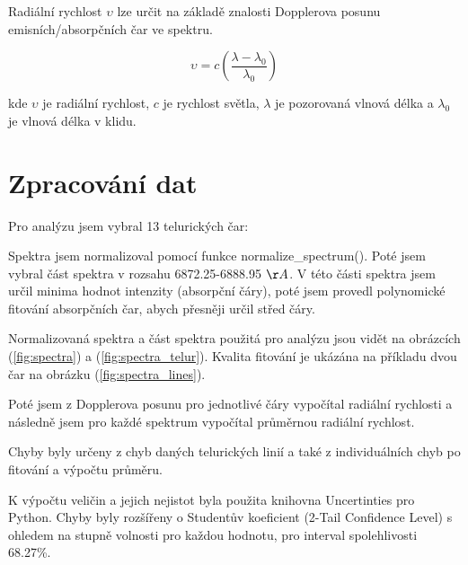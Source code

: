 \documentclass[a4paper,11pt,twocolumn]{article}
\begin{document}
        Radiální rychlost $\upsilon$ lze určit na základě znalosti Dopplerova posunu emisních/absorpčních čar ve spektru. 

        \begin{equation}
            \upsilon = c \left( \frac{\lambda - \lambda_0}{\lambda_0} \right) 
        \end{equation}

        kde $\upsilon$ je radiální rychlost, $c$ je rychlost světla, $\lambda$ je pozorovaná vlnová délka a $\lambda_0$ je vlnová délka v klidu.
        
    \section{Zpracování dat}
        Pro analýzu jsem vybral 13 telurických čar:


        \vspace{10pt}

        Spektra jsem normalizoval pomocí funkce normalize\_spectrum(). Poté jsem vybral část spektra v rozsahu 6872.25-6888.95 $\AA$. V této části spektra jsem určil minima hodnot intenzity (absorpční čáry), poté jsem provedl polynomické fitování absorpčních čar, abych přesněji určil střed čáry. 

        Normalizovaná spektra a část spektra použitá pro analýzu jsou vidět na obrázcích (\ref{fig:spectra}) a (\ref{fig:spectra_telur}). Kvalita fitování je ukázána na příkladu dvou čar na obrázku (\ref{fig:spectra_lines}).

        Poté jsem z Dopplerova posunu pro jednotlivé čáry vypočítal radiální rychlosti a následně jsem pro každé spektrum vypočítal průměrnou radiální rychlost.

        Chyby byly určeny z chyb daných telurických linií a také z individuálních chyb po fitování a výpočtu průměru. 

        K výpočtu veličin a jejich nejistot byla použita knihovna Uncertinties pro Python. Chyby byly rozšířeny o Studentův koeficient (2-Tail Confidence Level) s ohledem na stupně volnosti pro každou hodnotu, pro interval spolehlivosti 68.27\%.
\end{document}
